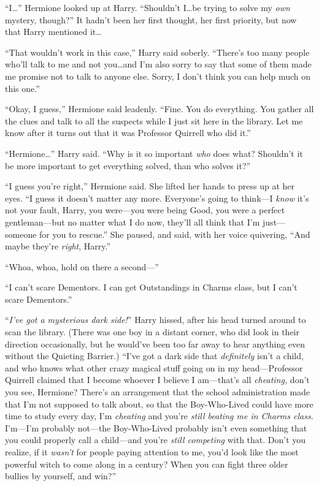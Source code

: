 “I…” Hermione looked up at Harry. “Shouldn’t I…be trying to solve my \emph{own} mystery, though?” It hadn’t been her first thought, her first priority, but now that Harry mentioned it…

“That wouldn’t work in this case,” Harry said soberly. “There’s too many people who’ll talk to me and not you…and I’m also sorry to say that some of them made me promise not to talk to anyone else. Sorry, I don’t think you can help much on this one.”

“Okay, I guess,” Hermione said leadenly. “Fine. You do everything. You gather all the clues and talk to all the suspects while I just sit here in the library. Let me know after it turns out that it was Professor Quirrell who did it.”

“Hermione…” Harry said. “Why is it so important \emph{who} does what? Shouldn’t it be more important to get everything solved, than who solves it?”

“I guess you’re right,” Hermione said. She lifted her hands to press up at her eyes. “I guess it doesn’t matter any more. Everyone’s going to think—I \emph{know} it’s not your fault, Harry, you were—you were being Good, you were a perfect gentleman—but no matter what I do now, they’ll all think that I’m just—someone for you to rescue.” She paused, and said, with her voice quivering, “And maybe they’re \emph{right}, Harry.”

“Whoa, whoa, hold on there a second—”

“I can’t scare Dementors. I can get Outstandings in Charms class, but I can’t scare Dementors.”

“\emph{I’ve got a mysterious dark side!}” Harry hissed, after his head turned around to scan the library. (There was one boy in a distant corner, who did look in their direction occasionally, but he would’ve been too far away to hear anything even without the Quieting Barrier.) “I’ve got a dark side that \emph{definitely} isn’t a child, and who knows what other crazy magical stuff going on in my head—Professor Quirrell claimed that I become whoever I believe I am—that’s all \emph{cheating,} don’t you see, Hermione? There’s an arrangement that the school administration made that I’m not supposed to talk about, so that the Boy-Who-Lived could have more time to study every day, I’m \emph{cheating} and you’re \emph{still beating me in Charms class.} I’m—I’m probably not—the Boy-Who-Lived probably isn’t even something that you could properly call a child—and you’re \emph{still competing} with that. Don’t you realize, if it \emph{wasn’t} for people paying attention to me, you’d look like the most powerful witch to come along in a century? When you can fight three older bullies by yourself, and win?”


